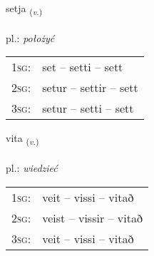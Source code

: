 \documentclass[frontgrid, backgrid]{flacards}\usepackage[]{graphicx}\usepackage[]{xcolor}
\begin{document}
\renewcommand{\flhead}{\vskip5pt \fboxsep=0pt {\small\bfseries\footnotesize Sagnorð | Verb}}
\renewcommand{\fcfoot}{\vskip5pt \fboxsep=0pt \hspace{2pt}{\small\bfseries\footnotesize 1K}}

\renewcommand{\blhead}{\vskip5pt {\small\bfseries\footnotesize Sagnorð | Verb }}
\renewcommand{\bcfoot}{\vskip5pt \hspace{2pt}{\small\bfseries\footnotesize 1K}}


{setja \small{\textsubscript{(\textit{v.})}} \\[1ex] %
\textphonetic{[sɛːtja]} \\
pl.: \emph{położyć} \\  [2ex]
\renewcommand*{\arraystretch}{0.8}
\begin{tabular}{p{1cm}l}
\textsc{1sg}: & set -- setti -- sett \\ 
\textsc{2sg}: & setur -- settir -- sett \\ 
\textsc{3sg}: & setur -- setti -- sett \\ 
\end{tabular}
}

\renewcommand{\flhead}{\vskip5pt \fboxsep=0pt {\small\bfseries\footnotesize Sagnorð | Verb}}
\renewcommand{\fcfoot}{\vskip5pt \fboxsep=0pt \hspace{2pt}{\small\bfseries\footnotesize 1K}}

\renewcommand{\blhead}{\vskip5pt {\small\bfseries\footnotesize Sagnorð | Verb }}
\renewcommand{\bcfoot}{\vskip5pt \hspace{2pt}{\small\bfseries\footnotesize 1K}}


{vita \small{\textsubscript{(\textit{v.})}} \\[1ex] %
\textphonetic{[vɪːta]} \\
pl.: \emph{wiedzieć} \\  [2ex]
\renewcommand*{\arraystretch}{0.8}
\begin{tabular}{p{1cm}l}
\textsc{1sg}: & veit -- vissi -- vitað \\ 
\textsc{2sg}: & veist -- vissir -- vitað \\ 
\textsc{3sg}: & veit -- vissi -- vitað \\ 
\end{tabular}
}
\end{document}
